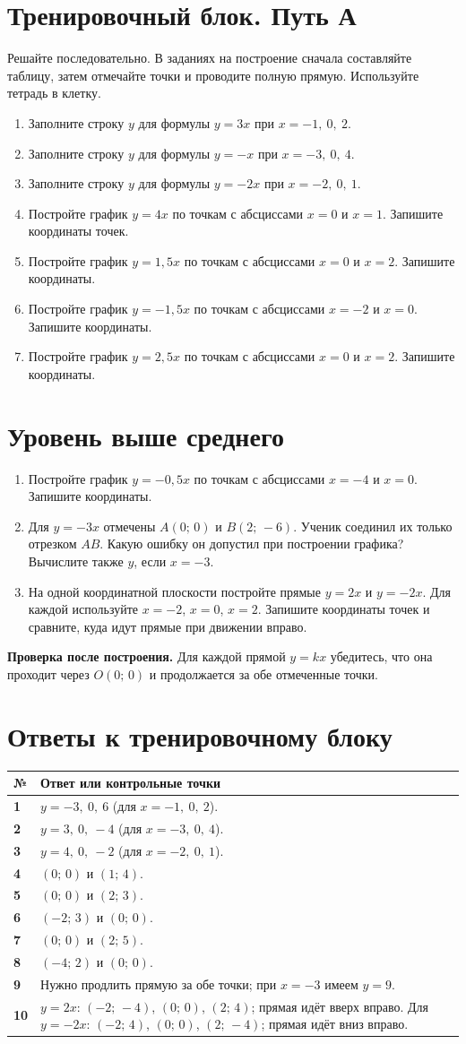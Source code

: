 \documentclass[a4paper,12pt]{article}
\newcommand{\sect}[1]{\vspace{0.55em}\section*{\color{darkaccent}\large #1}\vspace{-0.6em}{\color{accent}\rule{\linewidth}{0.45pt}}\vspace{0.3em}}
\newcommand{\subt}[1]{\vspace{0.45em}{\color{darkaccent}\bfseries #1}\par\vspace{-0.2em}}
\newcommand{\task}[1]{\item #1\vspace{0.35em}}
\begin{document}
\sect{Тренировочный блок. Путь А}
Решайте последовательно. В заданиях на построение сначала составляйте таблицу,
затем отмечайте точки и проводите полную прямую. Используйте тетрадь в клетку.

\subt{Базовый уровень}
\begin{enumerate}[label=\textbf{\arabic*.}]
\task{Заполните строку $y$ для формулы $y=3x$ при $x=-1,\ 0,\ 2$.}
\task{Заполните строку $y$ для формулы $y=-x$ при $x=-3,\ 0,\ 4$.}
\task{Заполните строку $y$ для формулы $y=-2x$ при $x=-2,\ 0,\ 1$.}
\subt{Средний уровень}
\task{Постройте график $y=4x$ по точкам с абсциссами $x=0$ и $x=1$. Запишите координаты точек.}
\task{Постройте график $y=1{,}5x$ по точкам с абсциссами $x=0$ и $x=2$. Запишите координаты.}
\task{Постройте график $y=-1{,}5x$ по точкам с абсциссами $x=-2$ и $x=0$. Запишите координаты.}
\task{Постройте график $y=2{,}5x$ по точкам с абсциссами $x=0$ и $x=2$. Запишите координаты.}
\end{enumerate}
\clearpage

\sect{Уровень выше среднего}
\begin{enumerate}[label=\textbf{\arabic*.},start=8]
\task{Постройте график $y=-0{,}5x$ по точкам с абсциссами $x=-4$ и $x=0$. Запишите координаты.}
\task{Для $y=-3x$ отмечены $A(0;\,0)$ и $B(2;\,-6)$. Ученик соединил их только отрезком $AB$. Какую ошибку он допустил при построении графика? Вычислите также $y$, если $x=-3$.}
\task{На одной координатной плоскости постройте прямые $y=2x$ и $y=-2x$. Для каждой используйте $x=-2$, $x=0$, $x=2$. Запишите координаты точек и сравните, куда идут прямые при движении вправо.}
\end{enumerate}
\vspace{1em}
\textbf{Проверка после построения.} Для каждой прямой $y=kx$ убедитесь, что она проходит через $O(0;\,0)$ и продолжается за обе отмеченные точки.
\clearpage

\sect{Ответы к тренировочному блоку}
\renewcommand{\arraystretch}{1.26}
\begin{tabularx}{\linewidth}{@{}>{\bfseries}p{12mm}X@{}}
\toprule
№ & Ответ или контрольные точки\\
\midrule
1 & $y=-3,\ 0,\ 6$ (для $x=-1,\ 0,\ 2$).\\
2 & $y=3,\ 0,\ -4$ (для $x=-3,\ 0,\ 4$).\\
3 & $y=4,\ 0,\ -2$ (для $x=-2,\ 0,\ 1$).\\
4 & $(0;\,0)$ и $(1;\,4)$.\\
5 & $(0;\,0)$ и $(2;\,3)$.\\
6 & $(-2;\,3)$ и $(0;\,0)$.\\
7 & $(0;\,0)$ и $(2;\,5)$.\\
8 & $(-4;\,2)$ и $(0;\,0)$.\\
9 & Нужно продлить прямую за обе точки; при $x=-3$ имеем $y=9$.\\
10 & $y=2x$: $(-2;\,-4)$, $(0;\,0)$, $(2;\,4)$; прямая идёт вверх вправо. Для $y=-2x$: $(-2;\,4)$, $(0;\,0)$, $(2;\,-4)$; прямая идёт вниз вправо.\\
\bottomrule
\end{tabularx}
\end{document}
